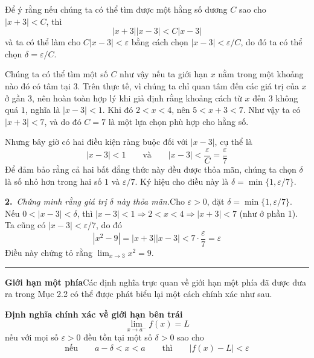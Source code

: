 \noindent
\begin{minipage}[t]{0.26\textwidth}
    \mbox{}
\end{minipage}%
\hfill
\begin{minipage}[t]{0.71\textwidth}
    \vspace{-4pt}
    \noindent Để ý rằng nếu chúng ta có thể tìm được một hằng số dương $C$ sao cho $|x + 3| < C$, thì
    \[
    |x + 3||x - 3| < C|x - 3|
    \]
    và ta có thể làm cho $C|x - 3| < \varepsilon$ bằng cách chọn $|x - 3| < \varepsilon/C$, do đó ta có thể chọn $\delta = \varepsilon/C$.

    Chúng ta có thể tìm một số $C$ như vậy nếu ta giới hạn $x$ nằm trong một khoảng nào đó có tâm tại $3$. Trên thực tế, vì chúng ta chỉ quan tâm đến các giá trị của $x$ ở gần $3$, nên hoàn toàn hợp lý khi giả định rằng khoảng cách từ $x$ đến $3$ không quá $1$, nghĩa là $|x - 3| < 1$. Khi đó $2 < x < 4$, nên $5 < x + 3 < 7$. Như vậy ta có $|x + 3| < 7$, và do đó $C = 7$ là một lựa chọn phù hợp cho hằng số.

    Nhưng bây giờ có hai điều kiện ràng buộc đối với $|x - 3|$, cụ thể là
    \[
    |x - 3| < 1 \qquad \text{và} \qquad |x - 3| < \frac{\varepsilon}{C} = \frac{\varepsilon}{7}
    \]
    Để đảm bảo rằng cả hai bất đẳng thức này đều được thỏa mãn, chúng ta chọn $\delta$ là số nhỏ hơn trong hai số $1$ và $\varepsilon/7$. Ký hiệu cho điều này là $\delta = \min\{1, \varepsilon/7\}$.

    \textbf{2.}\, \textit{Chứng minh rằng giá trị $\delta$ này thỏa mãn.}\quad Cho $\varepsilon > 0$, đặt $\delta = \min\{1, \varepsilon/7\}$. Nếu $0 < |x - 3| < \delta$, thì $|x - 3| < 1 \Rightarrow 2 < x < 4 \Rightarrow |x + 3| < 7$ (như ở phần 1). Ta cũng có $|x - 3| < \varepsilon/7$, do đó
    \[
    |x^2 - 9| = |x + 3||x - 3| < 7 \cdot \frac{\varepsilon}{7} = \varepsilon
    \]
    Điều này chứng tỏ rằng $\lim_{x \to 3} x^2 = 9$. \hfill {\color{stewartcyan}\rule{5pt}{5pt}}

    \vspace{0.8em}
    \noindent{\color{stewartcyan}\rule[0pt]{6.5pt}{6.5pt}}\hspace{0.5em}\textbf{\textsf{Giới hạn một phía}}\quad Các định nghĩa trực quan về giới hạn một phía đã được đưa ra trong Mục 2.2 có thể được phát biểu lại một cách chính xác như sau.

    \begin{definitionbox}
        \hspace{0.5em}\textbf{\textsf{\color{stewartred}Định nghĩa chính xác về giới hạn bên trái}}
        \[
        \lim_{x \to a^-} f(x) = L
        \]
        \noindent nếu với mọi số $\varepsilon > 0$ đều tồn tại một số $\delta > 0$ sao cho
        \[
        \text{nếu} \qquad a - \delta < x < a \qquad \text{thì} \qquad |f(x) - L| < \varepsilon
        \]
    \end{definitionbox}


\end{minipage}
